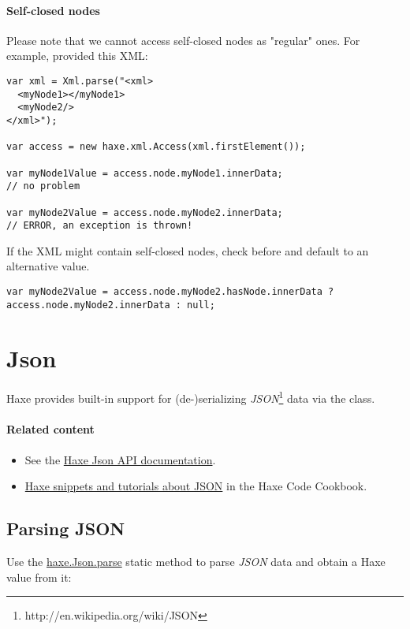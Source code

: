 \paragraph{Self-closed nodes}
Please note that we cannot access self-closed nodes as "regular" ones. 
For example, provided this XML:

\begin{lstlisting}
var xml = Xml.parse("<xml>
  <myNode1></myNode1>
  <myNode2/>
</xml>");

var access = new haxe.xml.Access(xml.firstElement());

var myNode1Value = access.node.myNode1.innerData; 
// no problem

var myNode2Value = access.node.myNode2.innerData; 
// ERROR, an exception is thrown!
\end{lstlisting}

If the XML might contain self-closed nodes, check  before and default to an alternative value.

\begin{lstlisting}
var myNode2Value = access.node.myNode2.hasNode.innerData ? access.node.myNode2.innerData : null; 
\end{lstlisting}

\section{Json}
\label{std-Json}

Haxe provides built-in support for (de-)serializing \emph{JSON}\footnote{http://en.wikipedia.org/wiki/JSON} data via the  class.

\paragraph{Related content}
\begin{itemize}
	\item See the \href{https://api.haxe.org/haxe/Json.html}{Haxe Json API documentation}.
	\item \href{http://code.haxe.org/tag/json.html}{Haxe snippets and tutorials about JSON} in the Haxe Code Cookbook.
\end{itemize}

\subsection{Parsing JSON}
\label{std-Json-parsing}

Use the \href{https://api.haxe.org/haxe/Json.html#parse}{haxe.Json.parse} static method to parse \emph{JSON} data and obtain a Haxe value from it:

